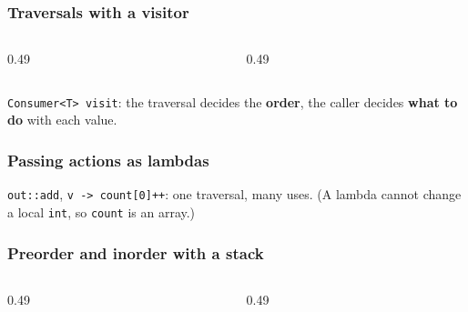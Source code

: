 \documentclass[aspectratio=169,10pt,compress]{beamer}
\begin{document}
\begin{frame}[t,fragile] \frametitle{Traversals with a visitor}
  \begin{columns}[T]
    \begin{column}{0.49\textwidth}
    \end{column}
    \begin{column}{0.49\textwidth}
    \end{column}
  \end{columns}

  \small \texttt{Consumer<T> visit}: the traversal decides the \textbf{order}, the caller decides \textbf{what to do} with each value.
\end{frame}




\begin{frame}[t,fragile] \frametitle{Passing actions as lambdas}

  \vspace{0.2em}
  \small \texttt{out::add}, \texttt{v -> count[0]++}: one traversal, many uses. (A lambda cannot change a local \texttt{int}, so \texttt{count} is an array.)
\end{frame}





\begin{frame}[t,fragile] \frametitle{Preorder and inorder with a stack}
  \begin{columns}[T]
    \begin{column}{0.49\textwidth}
    \end{column}
    \begin{column}{0.49\textwidth}
    \end{column}
  \end{columns}
\end{frame}
\end{document}

